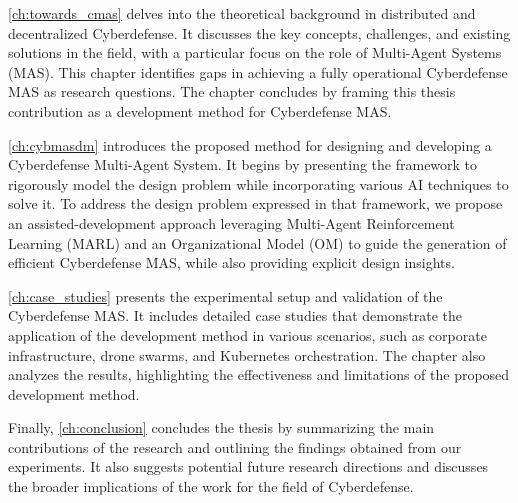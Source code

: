\autoref{ch:towards_cmas} delves into the theoretical background in distributed and decentralized Cyberdefense. It discusses the key concepts, challenges, and existing solutions in the field, with a particular focus on the role of Multi-Agent Systems (MAS). This chapter identifies gaps in achieving a fully operational Cyberdefense MAS as research questions. The chapter concludes by framing this thesis contribution as a development method for Cyberdefense MAS.

\autoref{ch:cybmasdm} introduces the proposed method for designing and developing a Cyberdefense Multi-Agent System. It begins by presenting the framework to rigorously model the design problem while incorporating various AI techniques to solve it. To address the design problem expressed in that framework, we propose an assisted-development approach leveraging Multi-Agent Reinforcement Learning (MARL) and an Organizational Model (OM) to guide the generation of efficient Cyberdefense MAS, while also providing explicit design insights.

\autoref{ch:case_studies} presents the experimental setup and validation of the Cyberdefense MAS. It includes detailed case studies that demonstrate the application of the development method in various scenarios, such as corporate infrastructure, drone swarms, and Kubernetes orchestration. The chapter also analyzes the results, highlighting the effectiveness and limitations of the proposed development method.

Finally, \autoref{ch:conclusion} concludes the thesis by summarizing the main contributions of the research and outlining the findings obtained from our experiments. It also suggests potential future research directions and discusses the broader implications of the work for the field of Cyberdefense.



